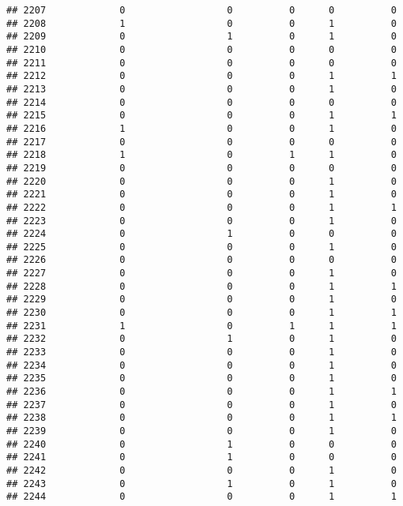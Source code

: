 \documentclass[
]{article}
\begin{document}
\begin{verbatim}
## 2207             0                  0          0      0          0
## 2208             1                  0          0      1          0
## 2209             0                  1          0      1          0
## 2210             0                  0          0      0          0
## 2211             0                  0          0      0          0
## 2212             0                  0          0      1          1
## 2213             0                  0          0      1          0
## 2214             0                  0          0      0          0
## 2215             0                  0          0      1          1
## 2216             1                  0          0      1          0
## 2217             0                  0          0      0          0
## 2218             1                  0          1      1          0
## 2219             0                  0          0      0          0
## 2220             0                  0          0      1          0
## 2221             0                  0          0      1          0
## 2222             0                  0          0      1          1
## 2223             0                  0          0      1          0
## 2224             0                  1          0      0          0
## 2225             0                  0          0      1          0
## 2226             0                  0          0      0          0
## 2227             0                  0          0      1          0
## 2228             0                  0          0      1          1
## 2229             0                  0          0      1          0
## 2230             0                  0          0      1          1
## 2231             1                  0          1      1          1
## 2232             0                  1          0      1          0
## 2233             0                  0          0      1          0
## 2234             0                  0          0      1          0
## 2235             0                  0          0      1          0
## 2236             0                  0          0      1          1
## 2237             0                  0          0      1          0
## 2238             0                  0          0      1          1
## 2239             0                  0          0      1          0
## 2240             0                  1          0      0          0
## 2241             0                  1          0      0          0
## 2242             0                  0          0      1          0
## 2243             0                  1          0      1          0
## 2244             0                  0          0      1          1

\end{verbatim}
\end{document}

